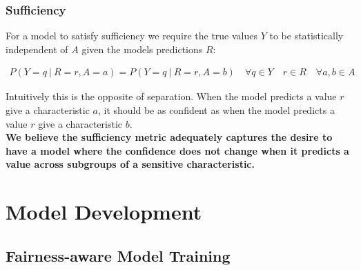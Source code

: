\documentclass[11pt]{article}
\begin{document}
\subsubsection{Sufficiency}

For a model to satisfy sufficiency we require the true values $Y$ to be statistically independent of $A$ given the models predictions $R$:

\begin{align*}
    P(Y=q\ |\ R=r,A=a)=P(Y=q\ |\ R=r,A=b)\quad \forall q\in Y\quad r\in R\quad \forall a,b\in A
\end{align*}

Intuitively this is the opposite of separation. When the model predicts a value $r$ give a characteristic $a$, it should be as confident as when the model predicts a value $r$ give a characteristic $b$.\\

\textbf{We believe the sufficiency metric adequately captures the desire to have a model where the confidence does not change when it predicts a value across subgroups of a sensitive characteristic.}

\section{Model Development}





\subsection{Fairness-aware Model Training}
\end{document}
